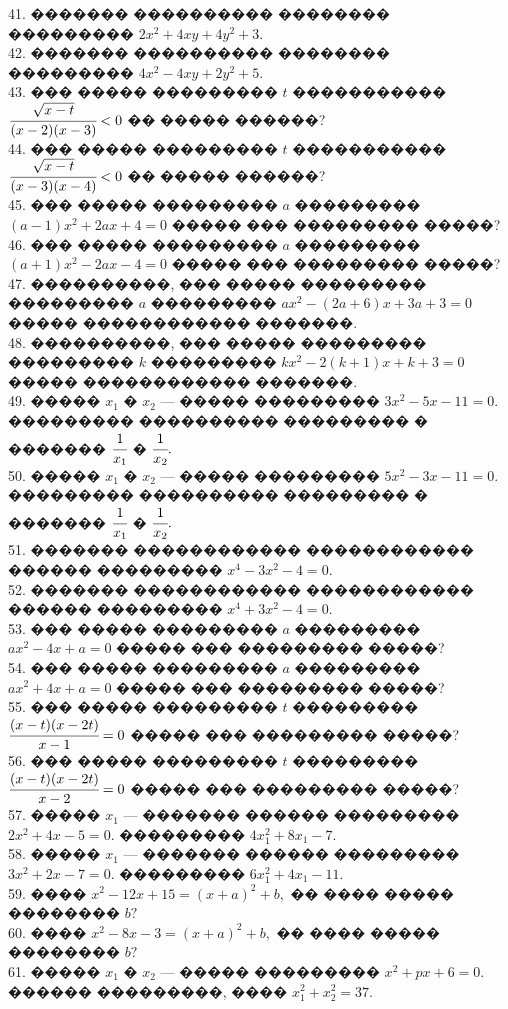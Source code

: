 \documentclass[12pt]{article}
\begin{document}
41. ������� ���������� �������� ��������� $2x^2+4xy+4y^2+3.$\\
42. ������� ���������� �������� ��������� $4x^2-4xy+2y^2+5.$\\
43. ��� ����� ��������� $t$ ����������� $\cfrac{\sqrt{x-t}}{(x-2)(x-3)}<0$ �� ����� ������?\\
44. ��� ����� ��������� $t$ ����������� $\cfrac{\sqrt{x-t}}{(x-3)(x-4)}<0$ �� ����� ������?\\
45. ��� ����� ��������� $a$ ��������� $(a-1)x^2+2ax+4=0$ ����� ��� ��������� �����?\\
46. ��� ����� ��������� $a$ ��������� $(a+1)x^2-2ax-4=0$ ����� ��� ��������� �����?\\
47. ����������, ��� ����� ��������� ��������� $a$ ��������� $ax^2-(2a+6)x+3a+3=0$ ����� ������������ �������.\\
48. ����������, ��� ����� ��������� ��������� $k$ ��������� $kx^2-2(k+1)x+k+3=0$ ����� ������������ �������.\\
49. ����� $x_1$ � $x_2$ --- ����� ��������� $3x^2-5x-11=0.$ ��������� ���������� ��������� � ������� $\cfrac{1}{x_1}$ � $\cfrac{1}{x_2}.$\\
50. ����� $x_1$ � $x_2$ --- ����� ��������� $5x^2-3x-11=0.$ ��������� ���������� ��������� � ������� $\cfrac{1}{x_1}$ � $\cfrac{1}{x_2}.$\\
51. ������� ������������ ������������ ������ ��������� $x^4-3x^2-4=0.$\\
52. ������� ������������ ������������ ������ ��������� $x^4+3x^2-4=0.$\\
53. ��� ����� ��������� $a$ ��������� $ax^2-4x+a=0$ ����� ��� ��������� �����?\\
54. ��� ����� ��������� $a$ ��������� $ax^2+4x+a=0$ ����� ��� ��������� �����?\\
55. ��� ����� ��������� $t$ ��������� $\cfrac{(x-t)(x-2t)}{x-1}=0$ ����� ��� ��������� �����?\\
56. ��� ����� ��������� $t$ ��������� $\cfrac{(x-t)(x-2t)}{x-2}=0$ ����� ��� ��������� �����?\\
57. ����� $x_1$ --- ������� ������ ��������� $2x^2+4x-5=0.$ ��������� $4x_1^2+8x_1-7.$\\
58. ����� $x_1$ --- ������� ������ ��������� $3x^2+2x-7=0.$ ��������� $6x_1^2+4x_1-11.$\\
59. ���� $x^2-12x+15=(x+a)^2+b,$ �� ���� ����� �������� $b?$\\
60. ���� $x^2-8x-3=(x+a)^2+b,$ �� ���� ����� �������� $b?$\\
61. ����� $x_1$ � $x_2$ --- ����� ��������� $x^2+px+6=0.$ ������ ���������, ���� $x_1^2+x_2^2=37.$\\
\end{document}

